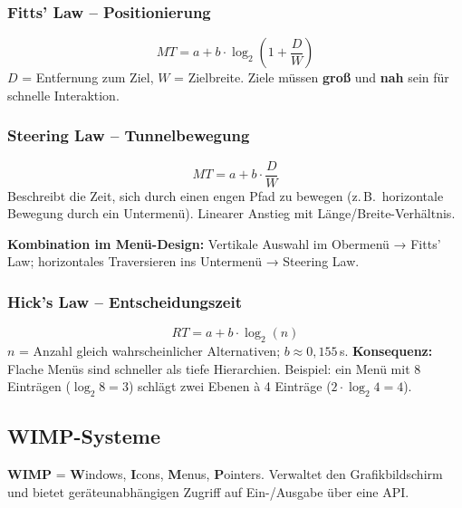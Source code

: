 \documentclass[12pt, a4paper]{article}
\begin{document}
\subsubsection*{Fitts' Law -- Positionierung}

\[
  MT = a + b \cdot \log_2\!\left(1 + \frac{D}{W}\right)
\]
$D$ = Entfernung zum Ziel, $W$ = Zielbreite. Ziele müssen \textbf{groß} und \textbf{nah} sein für schnelle Interaktion.

\subsubsection*{Steering Law -- Tunnelbewegung}

\[
  MT = a + b \cdot \frac{D}{W}
\]
Beschreibt die Zeit, sich durch einen engen Pfad zu bewegen (z.\,B.\ horizontale Bewegung durch ein Untermenü). Linearer Anstieg mit Länge/Breite-Verhältnis.

\textbf{Kombination im Menü-Design:} Vertikale Auswahl im Obermenü → Fitts' Law; horizontales Traversieren ins Untermenü → Steering Law.

\subsubsection*{Hick's Law -- Entscheidungszeit}

\[
  RT = a + b \cdot \log_2(n)
\]
$n$ = Anzahl gleich wahrscheinlicher Alternativen; $b \approx 0{,}155\,$s. \textbf{Konsequenz:} Flache Menüs sind schneller als tiefe Hierarchien. Beispiel: ein Menü mit 8 Einträgen ($\log_2 8 = 3$) schlägt zwei Ebenen à 4 Einträge ($2 \cdot \log_2 4 = 4$).

\subsection{WIMP-Systeme}

\textbf{WIMP} = \textbf{W}indows, \textbf{I}cons, \textbf{M}enus, \textbf{P}ointers. Verwaltet den Grafikbildschirm und bietet geräteunabhängigen Zugriff auf Ein-/Ausgabe über eine API.
\end{document}
